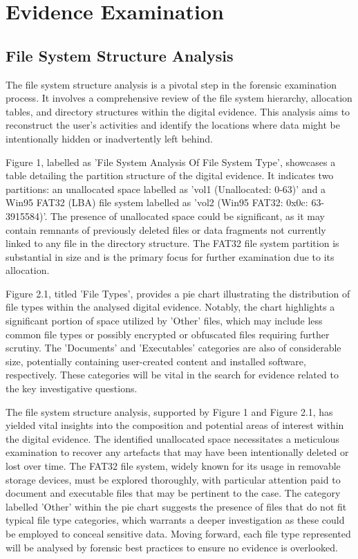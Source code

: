 \chapter{Evidence Examination}

\section{File System Structure Analysis}
The file system structure analysis is a pivotal step in the forensic examination process. It involves a comprehensive review of the file system hierarchy, allocation tables, and directory structures within the digital evidence. This analysis aims to reconstruct the user's activities and identify the locations where data might be intentionally hidden or inadvertently left behind.

Figure 1, labelled as 'File System Analysis Of File System Type', showcases a table detailing the partition structure of the digital evidence. It indicates two partitions: an unallocated space labelled as 'vol1 (Unallocated: 0-63)' and a Win95 FAT32 (LBA) file system labelled as 'vol2 (Win95 FAT32: 0x0c: 63-3915584)'. The presence of unallocated space could be significant, as it may contain remnants of previously deleted files or data fragments not currently linked to any file in the directory structure. The FAT32 file system partition is substantial in size and is the primary focus for further examination due to its allocation.

Figure 2.1, titled 'File Types', provides a pie chart illustrating the distribution of file types within the analysed digital evidence. Notably, the chart highlights a significant portion of space utilized by 'Other' files, which may include less common file types or possibly encrypted or obfuscated files requiring further scrutiny. The 'Documents' and 'Executables' categories are also of considerable size, potentially containing user-created content and installed software, respectively. These categories will be vital in the search for evidence related to the key investigative questions.

The file system structure analysis, supported by Figure 1 and Figure 2.1, has yielded vital insights into the composition and potential areas of interest within the digital evidence. The identified unallocated space necessitates a meticulous examination to recover any artefacts that may have been intentionally deleted or lost over time. The FAT32 file system, widely known for its usage in removable storage devices, must be explored thoroughly, with particular attention paid to document and executable files that may be pertinent to the case. The category labelled 'Other' within the pie chart suggests the presence of files that do not fit typical file type categories, which warrants a deeper investigation as these could be employed to conceal sensitive data. Moving forward, each file type represented will be analysed by forensic best practices to ensure no evidence is overlooked.

